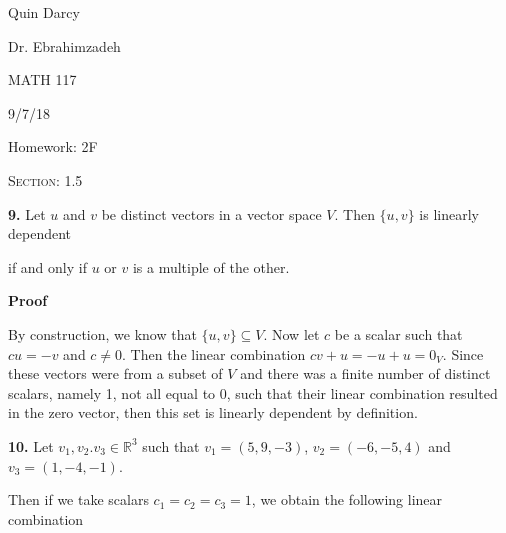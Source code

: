 \documentclass[12pt, a4paper]{article}
\begin{document}
  
 \begin{flushleft}
  
    Quin Darcy\par
    Dr. Ebrahimzadeh\par
    MATH 117\par
    9/7/18
  
 \end{flushleft}
  
 \centerline{Homework: 2F}
 
 \vspace{4mm}
 
 \noindent\textsc{Section: 1.5}\par
 
 \justifying
 
 \vspace{1mm}
 
 \hline
 
 \vspace{4mm}
 
 \noindent\textbf{9.} Let $u$ and $v$ be distinct vectors in a vector space $V$. Then $\{u,v\}$ is linearly dependent\par if and only if $u$ or $v$ is a multiple of the other.
 
 \vspace{4mm}
 
 \begin{addmargin}[1.4em]{1.4em}
 
    \noindent\textbf{Proof}\par
 
    \vspace{2mm}
 
    \noindent By construction, we know that $\{u,v\}\subseteq V$. Now let $c$ be a scalar such that $cu=-v$ and $c\neq 0$. Then the linear combination $cv+u=-u+u=0_V$. Since these vectors were from a subset of $V$ and there was a finite number of distinct scalars, namely 1, not all equal to $0$, such that their linear combination resulted in the zero vector, then this set is linearly dependent by definition.\hspace{60mm}\blacksquare
 
 \end{addmargin}
 
 \vspace{4mm}
 
 \noindent\textbf{10.} Let $v_1,v_2.v_3\in\mathbb{R}^3$ such that $v_1=(5,9,-3)$, $v_2=(-6,-5,4)$ and $v_3=(1,-4,-1)$.\par Then if we take scalars $c_1=c_2=c_3=1$, we obtain the following linear combination
 
\end{document}
